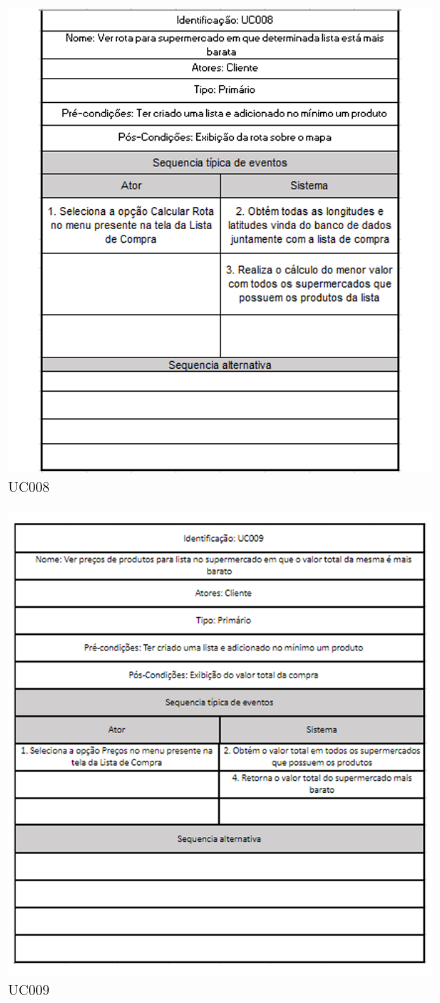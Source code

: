 \begin{figure}[H]
	\centering
		\caption{UC008}
		\includegraphics[scale=0.8]{Imagens/UC008.PNG}
\end{figure}
	
\begin{figure}[H]
	\centering
		\caption{UC009}
		\includegraphics[scale=0.8]{Imagens/UC009.PNG}
\end{figure}
	
